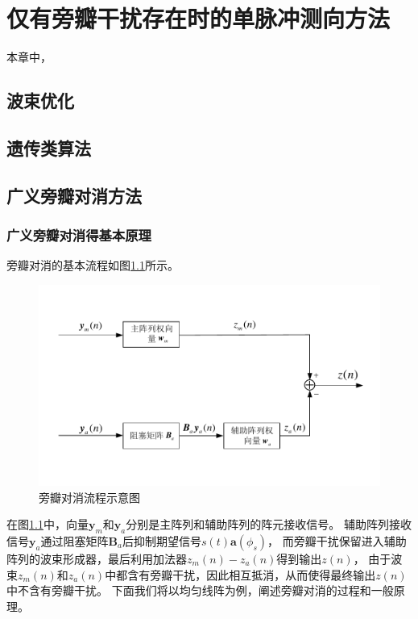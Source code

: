 \documentclass[master]{thesis-uestc}
\begin{document}
\chapter{仅有旁瓣干扰存在时的单脉冲测向方法}
本章中，

\section{波束优化}

\section{遗传类算法}

\section{广义旁瓣对消方法}

\subsection{广义旁瓣对消得基本原理}
旁瓣对消的基本流程如图\ref{GSC_process}所示。
\begin{figure}[h]
    \includegraphics[scale=0.8]{pic/GSC_process.pdf}
    \caption{旁瓣对消流程示意图}
    \label{GSC_process}
\end{figure}
在图\ref{GSC_process}中，向量$\bm{y}_m$和$\bm{y}_a$分别是主阵列和辅助阵列的阵元接收信号。
辅助阵列接收信号$\bm{y}_a$通过阻塞矩阵$\bm{B}_a$后抑制期望信号$s(t)\bm{a}(\phi_s)$，
而旁瓣干扰保留进入辅助阵列的波束形成器，最后利用加法器$z_m(n)-z_a(n)$得到输出$z(n)$，
由于波束$z_m(n)$和$z_a(n)$中都含有旁瓣干扰，因此相互抵消，从而使得最终输出$z(n)$中不含有旁瓣干扰。
下面我们将以均匀线阵为例，阐述旁瓣对消的过程和一般原理。
\end{document}
